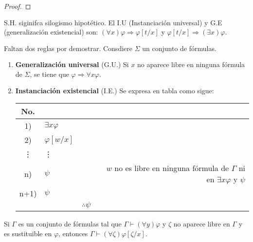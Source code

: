 \documentclass[12pt]{report}
\theoremstyle{largebreak}
\begin{document}
\begin{proof}
    \end{proof}

    \begin{obs}
        S.H. siginifca silogismo hipotético. El I.U (Instanciación universal) y G.E (generalización existencial) son:
        $(\forall x)\varphi\Rightarrow \varphi[t/x]$ y $\varphi[t/x]\Rightarrow (\exists x)\varphi$.
    \end{obs}

    Faltan dos reglas por demostrar. Consdiere $\Sigma$ un conjunto de fórmulas.
    \begin{enumerate}
        \item \textbf{Generalización universal} (G.U.) Si $x$ no aparece libre en ninguna fórmula de $\Sigma$, se tiene que $\varphi\Rightarrow\forall x\varphi$.
        \item \textbf{Instanciación existencial} (I.E.) Se expresa en tabla como sigue:
        \begin{center}
            \begin{tabular}{ c  l  l  r  }
                \hline
                No. &  &  &  \\
                \hline
                1) & $\exists x\varphi$ &  &  \\
                2) & $\varphi[w/x]$ &  &  \\
                \vdots & \vdots &  &  \\
                n) & $\psi$ &  & $w$ no es libre en ninguna fórmula de $\Gamma$ ni en $\exists x\varphi$ y $\psi$\\
                \hline
                n+1) & $\psi$ &  &  \\
                \hline
                  &  &  $\therefore \psi $ &  \\
            \end{tabular}
        \end{center}
    \end{enumerate}

    \begin{lema}
        Si $\Gamma$ es un conjunto de fórmulas tal que $\Gamma\vdash (\forall y)\varphi$ y $\zeta$ no aparece libre en $\Gamma$ y es sustituible en $\varphi$, entonces $\Gamma\vdash(\forall \zeta)\varphi[\zeta/x]$.
    \end{lema}
\end{document}
